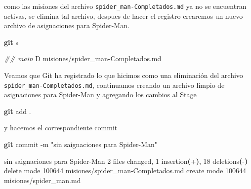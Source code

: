 \documentclass[
]{book}
\newenvironment{Shaded}{\begin{snugshade}}{\end{snugshade}}
\newcommand{\AttributeTok}[1]{\textcolor[rgb]{0.13,0.29,0.53}{#1}}
\newcommand{\CommentTok}[1]{\textcolor[rgb]{0.56,0.35,0.01}{\textit{#1}}}
\newcommand{\ErrorTok}[1]{\textcolor[rgb]{0.64,0.00,0.00}{\textbf{#1}}}
\newcommand{\ExtensionTok}[1]{#1}
\newcommand{\FunctionTok}[1]{\textcolor[rgb]{0.13,0.29,0.53}{\textbf{#1}}}
\newcommand{\KeywordTok}[1]{\textcolor[rgb]{0.13,0.29,0.53}{\textbf{#1}}}
\newcommand{\NormalTok}[1]{#1}
\newcommand{\StringTok}[1]{\textcolor[rgb]{0.31,0.60,0.02}{#1}}
\begin{document}
como las misiones del archivo \texttt{spider\_man-Completados.md} ya no se encuentran activas, se elimina tal archivo, despues de hacer el registro crearemos un nuevo archivo de asignaciones para Spider-Man.

\begin{Shaded}
\begin{Highlighting}[]
\FunctionTok{git}\NormalTok{ s}
\end{Highlighting}
\end{Shaded}

\begin{Shaded}
\begin{Highlighting}[]
\CommentTok{\#\# main}
 \ExtensionTok{D}\NormalTok{ misiones/spider\_man{-}Completados.md}
\end{Highlighting}
\end{Shaded}

Veamos que Git ha registrado lo que hicimos como una eliminación del archivo \texttt{spider\_man-Completados.md}, continuamos creando un archivo limpio de asignaciones para Spider-Man y agregando los cambios al Stage

\begin{Shaded}
\begin{Highlighting}[]
\FunctionTok{git}\NormalTok{ add .}
\end{Highlighting}
\end{Shaded}

y hacemos el correspondiente commit

\begin{Shaded}
\begin{Highlighting}[]
\FunctionTok{git}\NormalTok{ commit }\AttributeTok{{-}m} \StringTok{"sin saignaciones para Spider{-}Man"}
\end{Highlighting}
\end{Shaded}

\begin{Shaded}
\begin{Highlighting}[]
\ExtensionTok{[main}\NormalTok{ c9ffd15] sin saignaciones para Spider{-}Man}
 \ExtensionTok{2}\NormalTok{ files changed, 1 insertion}\ErrorTok{(}\ExtensionTok{+}\KeywordTok{)}\ExtensionTok{,}\NormalTok{ 18 deletions}\ErrorTok{(}\ExtensionTok{{-}}\KeywordTok{)}
 \ExtensionTok{delete}\NormalTok{ mode 100644 misiones/spider\_man{-}Completados.md}
 \ExtensionTok{create}\NormalTok{ mode 100644 misiones/spider\_man.md}
\end{Highlighting}
\end{Shaded}
\end{document}
